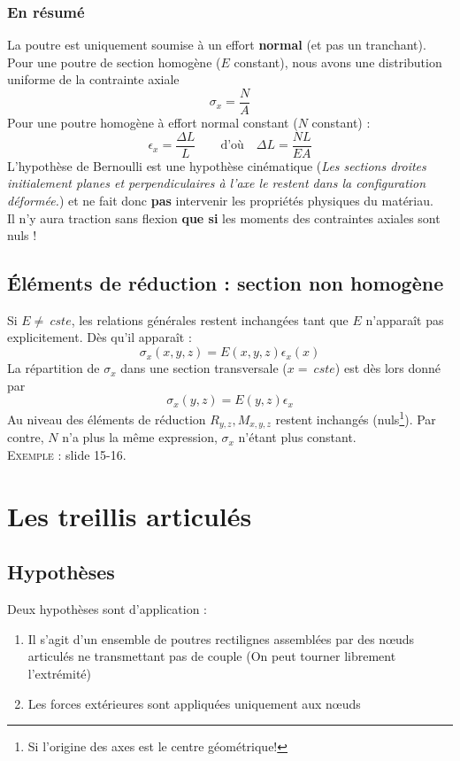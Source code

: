 		\subsubsection{En résumé}
		La poutre est uniquement soumise à un effort \textbf{normal} (et pas 
		un tranchant). Pour une poutre de section homogène ($E$ constant), 
		nous avons une distribution uniforme de la contrainte axiale 
		\begin{equation}
		\sigma_x = \dfrac{N}{A}
		\end{equation}
		Pour une poutre homogène à effort normal constant ($N$ constant) :
		\begin{equation}
		\epsilon_x = \dfrac{\Delta L}{L}\qquad\text{d'où}\quad \Delta L = 
		\dfrac{NL}{EA}
		\end{equation}
		L'hypothèse de Bernoulli est une hypothèse cinématique (\textit{Les 
		sections droites initialement planes et perpendiculaires à l'axe le
		restent dans la configuration déformée.}) et ne fait donc \textbf{pas} 
		intervenir les propriétés physiques du matériau.\\
		\danger Il n'y aura traction sans flexion \textbf{que si} les moments 
		des contraintes axiales sont nuls !
		
		
	\subsection{Éléments de réduction : section non homogène}		
	Si $E \neq\ cste$, les relations générales restent inchangées tant que 
	$E$ n'apparaît pas explicitement. Dès qu'il apparaît :
	\begin{equation}
	\sigma_x(x,y,z) = E(x,y,z)\epsilon_x(x)
	\end{equation}
	La répartition de $\sigma_x$ dans une section transversale ($x =\ cste$) 
	est dès lors donné par 
	\begin{equation}
	\sigma_x(y,z) = E(y,z)\epsilon_x
	\end{equation}
	Au niveau des éléments de réduction $R_{y,z}, M_{x,y,z}$ restent inchangés 
	(nuls\footnote{Si l'origine des axes est le centre géométrique!}). Par contre, 
	$N$ n'a plus la même expression, $\sigma_x$ n'étant plus constant.\\
	\textsc{Exemple} : slide 15-16.
	
\section{Les treillis articulés}
	\subsection{Hypothèses}
	Deux hypothèses sont d'application :
	\begin{enumerate}
	\item Il s'agit d'un ensemble de poutres rectilignes assemblées par des 
	nœuds articulés ne transmettant pas de couple (On peut tourner librement 
	l’extrémité)
	\item Les forces extérieures sont appliquées uniquement aux nœuds
	\end{enumerate}
	
